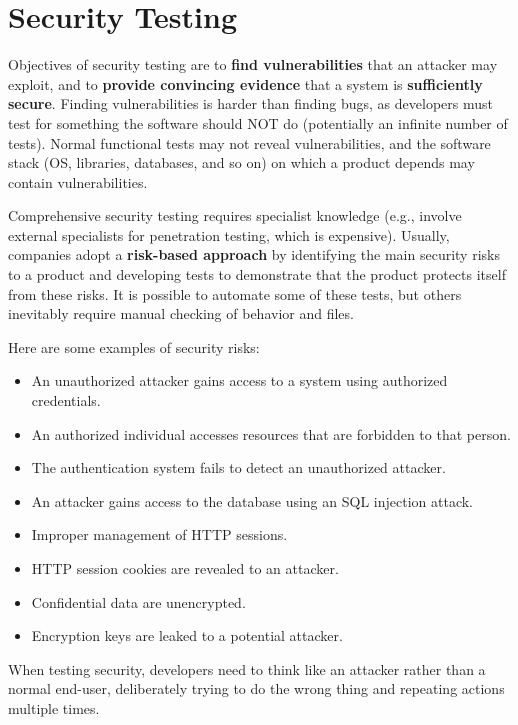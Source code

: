 \section{Security Testing}

Objectives of security testing are to \textbf{find vulnerabilities} that an attacker may exploit, and to \textbf{provide convincing evidence} that a system is \textbf{sufficiently secure}. Finding vulnerabilities is harder than finding bugs, as developers must test for something the software should NOT do (potentially an infinite number of tests). Normal functional tests may not reveal vulnerabilities, and the software stack (OS, libraries, databases, and so on) on which a product depends may contain vulnerabilities.

Comprehensive security testing requires specialist knowledge (e.g., involve external specialists for penetration testing, which is expensive). Usually, companies adopt a \textbf{risk-based approach} by identifying the main security risks to a product and developing tests to demonstrate that the product protects itself from these risks. \newpage \noindent It is possible to automate some of these tests, but others inevitably require manual checking of behavior and files.

\noindent Here are some examples of security risks:
\begin{itemize}
    \item An unauthorized attacker gains access to a system using authorized credentials.
    \item An authorized individual accesses resources that are forbidden to that person.
    \item The authentication system fails to detect an unauthorized attacker.
    \item An attacker gains access to the database using an SQL injection attack.
    \item Improper management of HTTP sessions.
    \item HTTP session cookies are revealed to an attacker.
    \item Confidential data are unencrypted.
    \item Encryption keys are leaked to a potential attacker.
\end{itemize}

When testing security, developers need to think like an attacker rather than a normal end-user, deliberately trying to do the wrong thing and repeating actions multiple times.

